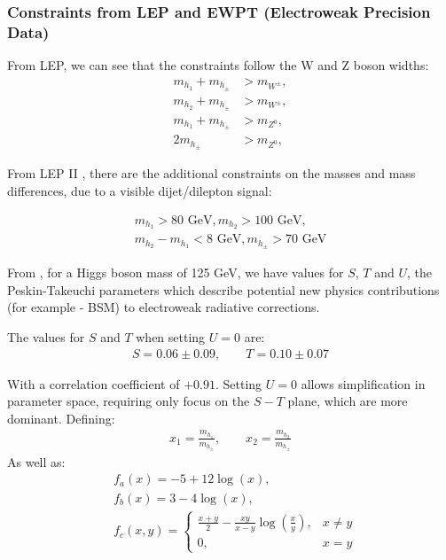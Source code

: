 \documentclass[12pt]{article}
\begin{document}
\subsubsection{Constraints from LEP and EWPT (Electroweak Precision Data)}
From LEP, we can see that the constraints follow the W and Z boson widths:
\begin{equation}
    \begin{split}
        m_{h_1} + m_{h_\pm} &> m_{W^\pm},
        \\m_{h_2} + m_{h_\pm} &> m_{W^\pm},
        \\m_{h_1} + m_{h_\pm} &> m_{Z^0},
        \\2m_{h_\pm} &> m_{Z^0}, 
    \end{split}
\label{LEP2}
\end{equation}

From LEP II \cite{Lundstr_m_2009}, there are the additional constraints on the masses and mass differences, due to a visible dijet/dilepton signal:

\begin{equation}
    \begin{split}
        m_{h_1}> 80 \text{ GeV},
        m_{h_2}> 100 \text{ GeV},
        \\
        m_{h_2} - m_{h_1} < 8\text{ GeV},
        m_{h_\pm}> 70\text{ GeV}
    \end{split}
\label{LEP2_2}
\end{equation}

From \cite{gfitter2014global}, for a Higgs boson mass of 125 GeV, we have values for $S$, $T$ and $U$, the Peskin-Takeuchi parameters \cite{PeskinTakeuchi1990} which describe potential new physics contributions (for example - BSM) to electroweak radiative corrections.

 The values for $S$ and $T$ when setting $U = 0$ are:
 \begin{align}
     S = 0.06 \pm0.09, \qquad
     T = 0.10\pm0.07
 \end{align}

With a correlation coefficient of $+0.91$. Setting $U = 0$ allows simplification in parameter space, requiring only focus on the $S-T$ plane, which are more dominant. Defining:
\begin{align}
    x_1 = \frac{m_{h_1}}{m_{h_\pm}}, \qquad 
    x_2 = \frac{m_{h_2}}{m_{h_\pm}}
\end{align}
As well as:
\begin{align}
    &f_a(x) = -5 +12\log(x), \qquad
    \\&f_b(x) = 3-4\log(x),
    \\
    &f_c(x,y) = 
    \begin{cases}
        \frac{x+y}{2}-\frac{xy}{x-y}\log{\left(\frac{x}{y}\right)}, & x\neq y\\
        0, & x = y
    \end{cases}
\end{align}
\end{document}
